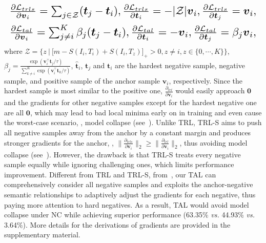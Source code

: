 \documentclass[10pt,twocolumn,letterpaper]{article}
\begin{document}
\begin{equation}              
 \resizebox{\linewidth}{!}{$                                  
     \frac{\partial \mathcal{L}_{trls}}{\partial\boldsymbol{v}_i} = \sum^{}_{j\in\mathcal{Z}}({\boldsymbol{t}}_j-\boldsymbol{t}_i),  \frac{\partial \mathcal{L}_{trls}}{\partial{\boldsymbol{t}}_i} = - |\mathcal{Z}|\boldsymbol{v}_i,  \frac{\partial \mathcal{L}_{trls}}{\partial{\boldsymbol{t}}_j} = \boldsymbol{v}_i,$}
\label{eq_g_trls} 
\end{equation}
\begin{equation}     
 \resizebox{\linewidth}{!}{$                                           
     \frac{\partial \mathcal{L}_{tal}}{\partial\boldsymbol{v}_i} = \sum^K_{j\neq i}\beta_j (\boldsymbol{t}_j-\boldsymbol{t}_i),  \frac{\partial \mathcal{L}_{tal}}{\partial{\boldsymbol{t}}_i} = - \boldsymbol{v}_i,  \frac{\partial \mathcal{L}_{tal}}{\partial{\boldsymbol{t}}_j} = \beta_j\boldsymbol{v}_i,$}
\label{eq_g_tal} 
\end{equation}
where $\mathcal{Z}=\{z\ |\ \big[m-S(I_i,T_i)+S(I_i,T_z)\big]_+>0, z\neq i, z\in\{0,\cdots,K\} \}$, $\beta_j=\frac{\exp( \boldsymbol{v}_i^\top\boldsymbol{t}_j
/\tau)}{\sum^K_{k\neq i}\exp(\boldsymbol{v}_i^\top\boldsymbol{t}_k/\tau)} $, $\hat{\boldsymbol{t}}_i$, $\boldsymbol{t}_j$ and $\boldsymbol{t}_i$ are the hardest negative sample, negative sample, and positive sample of the anchor sample $\boldsymbol{v}_i$, respectively. Since the hardest sample is most similar to the positive one, $\frac{\partial_{trl}}{\partial\boldsymbol{v}_i}$ would easily approach $\boldsymbol{0}$ and the gradients for other negative samples except for the hardest negative one are all $\boldsymbol{0}$, which may lead to bad local minima early on in training and even cause the worst-case scenario, \ie, model collapse (see~). Unlike TRL, TRL-S aims to push all negative samples away from the anchor by a constant margin and produces stronger gradients for the anchor, \ie, $\|\frac{\partial_{trls}}{\partial\boldsymbol{v}_i}\|_2\ge  \|\frac{\partial_{trl}}{\partial\boldsymbol{v}_i}\|_2$, thus avoiding model collapse (see~). However, the drawback is that TRL-S treats every negative sample equally while ignoring challenging ones, which limits performance improvement. Different from TRL and TRL-S, from~, our TAL can comprehensively consider all negative samples and exploits the anchor-negative semantic relationships to adaptively adjust the gradients for each negative, thus paying more attention to hard negatives. As a result, TAL would avoid model collapse under NC while achieving superior performance (63.35\% \textit{vs.} 44.93\% \textit{vs.} 3.64\%). More details for the derivations of gradients are provided in the supplementary material.
\end{document}
